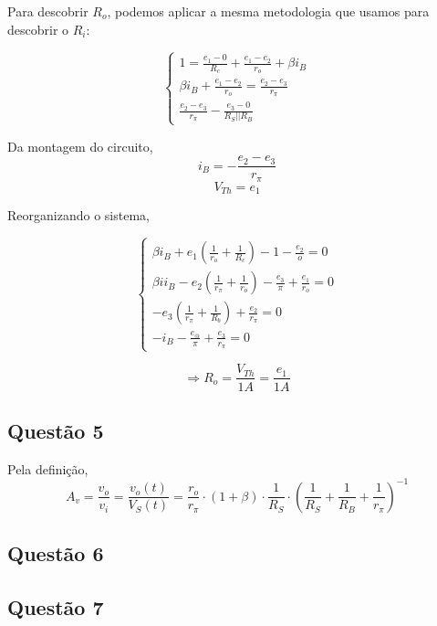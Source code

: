 \documentclass[12pt, a4paper, twoside]{article}
\begin{document}
Para descobrir $R_o$, podemos aplicar a mesma metodologia que usamos para descobrir o $R_i$:

\begin{equation}
    \begin{cases}
        1 = \frac{e_1 - 0}{R_c} + \frac{e_1 - e_2}{r_o} + \beta i_B \\
        \beta i_B + \frac{e_1 - e_2}{r_o} = \frac{e_2 - e_3}{r_\pi} \\
         \frac{e_2 - e_3}{r_\pi} - \frac{e_3 - 0}{R_S || R_B}
    \end{cases}
\end{equation}

Da montagem do circuito,
$$ i_B = -\frac{e_2 - e_3}{r_\pi} $$
$$ V_{Th} = e_1 $$

Reorganizando o sistema,

\begin{equation}
    \begin{cases}
        \beta i_B + e_1 \left(\frac{1}{r_o} + \frac{1}{R_c}\right) - 1 - \frac{e_2}{o} = 0 \\
        \beta ii_B - e_2 \left(\frac{1}{r_\pi} + \frac{1}{r_o}\right) - \frac{e_3}{\pi} + \frac{e_1}{r_o} = 0\\
        - e_3 \left(\frac{1}{r_\pi} + \frac{1}{R_b}\right) + \frac{e_2}{r_\pi} = 0 \\
        - i_B - \frac{e_@}{\pi} + \frac{e_3}{r_\pi} = 0
    \end{cases}
\end{equation}

$$ \Rightarrow R_o = \frac{V_{Th}}{1A} = \frac{e_1}{1A} $$

\subsection{Questão 5}

Pela definição,
$$ A_v = \frac{v_o}{v_i} = \frac{v_o(t)}{V_S(t)} = \frac{r_o}{r_\pi} \cdot (1+\beta) \cdot \frac{1}{R_S} \cdot \left(\frac{1}{R_S} + \frac{1}{R_B} + \frac{1}{r_\pi} \right)^{-1} $$

\subsection{Questão 6}


\subsection{Questão 7}
\end{document}
